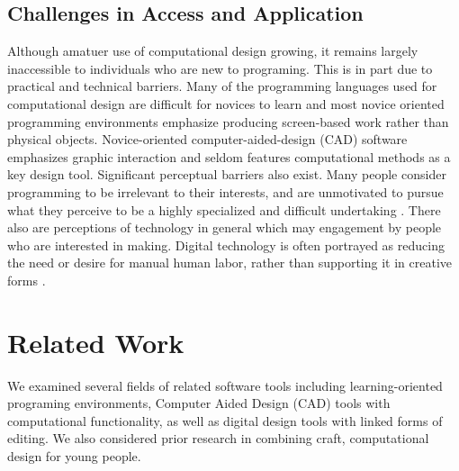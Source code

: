 \documentclass{sigchi}
\begin{document}
\subsection{Challenges in Access and Application}
Although amatuer use of computational design growing, it remains largely inaccessible to individuals who are new to programing. This is in part due to practical and technical barriers. Many of the programming languages used for computational design are difficult for novices to learn and most novice oriented programming environments emphasize producing screen-based work rather than physical objects. Novice-oriented computer-aided-design (CAD) software emphasizes graphic interaction and seldom features computational methods as a key design tool. Significant perceptual barriers also exist. Many people consider programming to be irrelevant to their interests, and are unmotivated to pursue what they perceive to be a highly specialized and difficult undertaking \cite{resnick1}. There also are perceptions of technology in general which may engagement by people who are interested in making. Digital technology is often portrayed as reducing the need or desire for manual human labor, rather than supporting it in creative forms \cite{rosner_craft_vs_design}.

\section{Related Work}
We examined several fields of related software tools including learning-oriented programing environments, Computer Aided Design (CAD) tools with computational functionality, as well as digital design tools with linked forms of editing. We also considered prior research in combining craft, computational design for young people.
\end{document}
